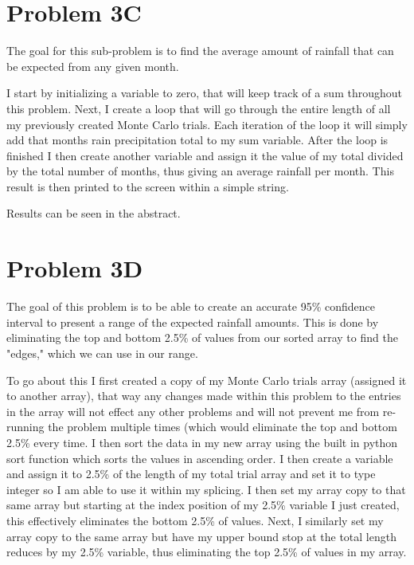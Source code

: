 \documentclass[twocolumn]{revtex4}
\begin{document}
\section{Problem 3C}
The goal for this sub-problem is to find the average amount of rainfall that can be expected from any given month.

I start by initializing a variable to zero, that will keep track of a sum throughout this problem. Next, I create a loop that will go through the entire length of all my previously created Monte Carlo trials. Each iteration of the loop it will simply add that months rain precipitation total to my sum variable. After the loop is finished I then create another variable and assign it the value of my total divided by the total number of months, thus giving an average rainfall per month. This result is then printed to the screen within a simple string. 

\begin{it}Results can be seen in the abstract.
\end{it}

\section{Problem 3D}
The goal of this problem is to be able to create an accurate 95\% confidence interval to present a range of the expected rainfall amounts. This is done by eliminating the top and bottom 2.5\% of values from our sorted array to find the "edges," which we can use in our range. 

To go about this I first created a copy of my Monte Carlo trials array (assigned it to another array), that way any changes made within this problem to the entries in the array will not effect any other problems and will not prevent me from re-running the problem multiple times (which would eliminate the top and bottom 2.5\% every time. I then sort the data in my new array using the built in python sort function which sorts the values in ascending order. I then create a variable and assign it to 2.5\% of the length of my total trial array and set it to type integer so I am able to use it within my splicing. I then set my array copy to that same array but starting at the index position of my 2.5\% variable I just created, this effectively eliminates the bottom 2.5\% of values. Next, I similarly set my array copy to the same array but have my upper bound stop at the total length reduces by my 2.5\% variable, thus eliminating the top 2.5\% of values in my array. 
\end{document}
